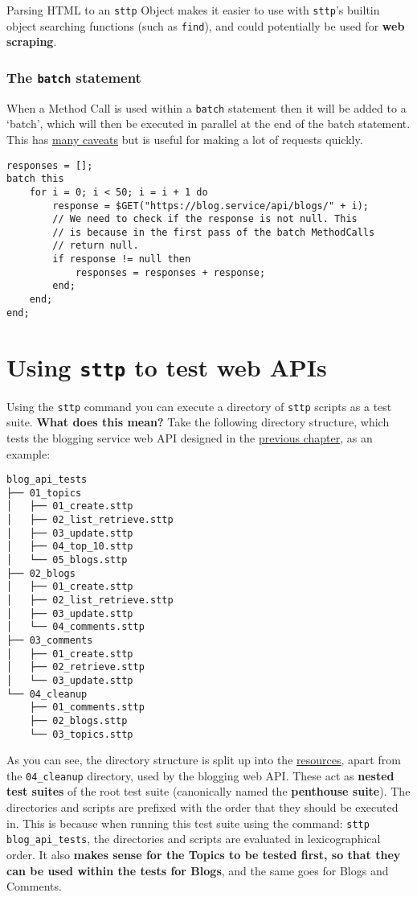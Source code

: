 Parsing HTML to an \verb|sttp| Object makes it easier to use with \verb|sttp|'s builtin object searching functions (such as \verb|find|), and could potentially be used for \textbf{web scraping}.

\cprotect\subsubsection{The \verb|batch| statement}

When a Method Call is used within a \verb|batch| statement then it will be added to a `batch', which will then be executed in parallel at the end of the batch statement. This has \hyperref[chap:eval-ast-nodes-batch-edge-cases]{many caveats} but is useful for making a lot of requests quickly.

\begin{verbatim}
responses = [];
batch this
    for i = 0; i < 50; i = i + 1 do
        response = $GET("https://blog.service/api/blogs/" + i);
        // We need to check if the response is not null. This
        // is because in the first pass of the batch MethodCalls
        // return null.
        if response != null then
            responses = responses + response;
        end;
    end;
end;
\end{verbatim}

\cprotect\section{Using \verb|sttp| to test web APIs}
\label{sec:hello-sttp-using-sttp-to-test}

Using the \verb|sttp| command you can execute a directory of \verb|sttp| scripts as a test suite. \textbf{What does this mean?} Take the following directory structure, which tests the blogging service web API designed in the \hyperref[chap:designing-rest-api]{previous chapter}, as an example:

\begin{verbatim}
blog_api_tests
├── 01_topics
│   ├── 01_create.sttp
│   ├── 02_list_retrieve.sttp
│   ├── 03_update.sttp
│   ├── 04_top_10.sttp
│   └── 05_blogs.sttp
├── 02_blogs
│   ├── 01_create.sttp
│   ├── 02_list_retrieve.sttp
│   ├── 03_update.sttp
│   └── 04_comments.sttp
├── 03_comments
│   ├── 01_create.sttp
│   ├── 02_retrieve.sttp
│   └── 03_update.sttp
└── 04_cleanup
    ├── 01_comments.sttp
    ├── 02_blogs.sttp
    └── 03_topics.sttp
\end{verbatim}

As you can see, the directory structure is split up into the \hyperref[sec:designing-rest-api-blogging-service]{resources}, apart from the \verb|04_cleanup| directory, used by the blogging web API. These act as \textbf{nested test suites} of the root test suite (canonically named the \textbf{penthouse suite}). The directories and scripts are prefixed with the order that they should be executed in. This is because when running this test suite using the command: \verb|sttp blog_api_tests|, the directories and scripts are evaluated in lexicographical order. It also \textbf{makes sense for the Topics to be tested first, so that they can be used within the tests for Blogs}, and the same goes for Blogs and Comments.

